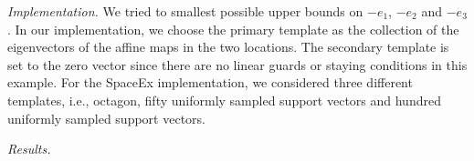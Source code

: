 \emph{Implementation.}  We tried to smallest possible upper bounds on
$-e_1$, $-e_2$ and $-e_3$.  In our implementation, we choose the
primary template as the collection of the eigenvectors of the affine
maps in the two locations.  The secondary template is set to the zero
vector since there are no linear guards or staying conditions in this
example.  For the SpaceEx implementation, we considered three
different templates, i.e., octagon, fifty uniformly sampled support
vectors and hundred uniformly sampled support vectors.

\emph{Results.}  




